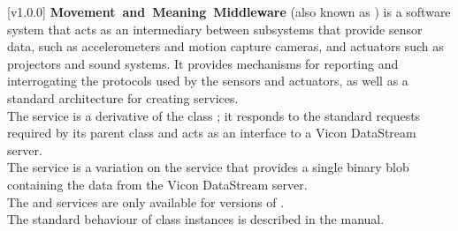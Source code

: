 [v1.0.0]
\textbf{Movement~and~Meaning~Middleware} (also known as \mplusm) is a software system
that acts as an intermediary between subsystems that provide sensor data, such as
accelerometers and motion capture cameras, and actuators such as projectors and sound
systems.
It provides mechanisms for reporting and interrogating the protocols used by the sensors
and actuators, as well as a standard architecture for creating services.\\

The \VDSI{} service is a derivative of the \mplusm{} class ;
it responds to the standard requests required by its parent class and acts as an interface
to a Vicon DataStream server.\\

The \VBI{} service is a variation on the \VDSI{} service that provides a single binary
blob containing the data from the Vicon DataStream server.\\

The \VDSI{} and \VBI{} services are only available for \win{} versions of \mplusm.\\

The standard behaviour of  class instances is described in
the \emph{\MMM} manual.
\primaryEnd{}

